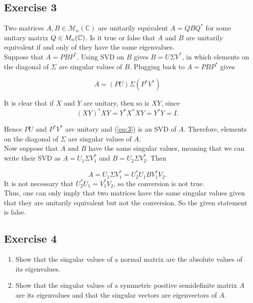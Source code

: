 \subsection*{Exercise 3}
Two matrices $A,B\in\mathcal{M}_n(\mathbb{C})$ are unitarily equivalent $A=QBQ^*$ for some unitary matrix $Q\in\mathcal\mathcal{M}_n(\mathbb{C})$. Is it true or false that $A$ and $B$ are unitarily equivalent if and only of they have the same eigenvalues.\\


Suppose that $A = PBP^*$. Using SVD on $B$ gives $B = U\Sigma V^*$, in which elements on the diagonal of $\Sigma$ are singular values of $B$. Plugging back to  $A = PBP^*$ gives

\begin{equation}
\label{eq:3}
    A = (PU)\Sigma(P^*V^*)
\end{equation}

It is clear that if $X$ and $Y$ are unitary, then so is $XY$, since 
$$(XY)^*XY = Y^*X^*XY = Y^*Y = I.$$

Hence $PU$ and $P^*V^*$ are unitary and (\ref{eq:3}) is an SVD of $A$. Therefore, elements on the diagonal of $\Sigma$ are singular values of $A$. \\

Now suppose that $A$ and $B$ have the same singular values, meaning that we can write their SVD as $A = U_1\Sigma V_1^*$ and $B = U_2\Sigma V_2^*$. Then

$$A = U_1\Sigma V_1^* = U_2^*U_1BV_1^*V_2.$$
It is not necessary that $U_2^*U_1 = V_1^*V_2$, so the conversion is not true. \\

Thus, one can only imply that two matrices have the same singular values given that they are unitarily equivalent but not the conversion. So the given statement is false.

\subsection*{Exercise 4}
\begin{enumerate}
    \item Show that the singular values of a normal matrix are the absolute values of its eigenvalues.
    \item  Show that the singular values of a symmetric positive semidefinite matrix $A$ are its eigenvalues and
that the singular vectors are eigenvectors of $A$.
\end{enumerate}

